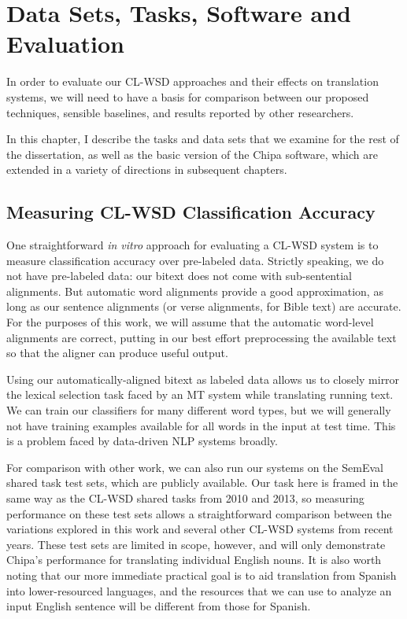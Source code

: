 \chapter{Data Sets, Tasks, Software and Evaluation}
\label{chap:evaluation}
In order to evaluate our CL-WSD approaches and their effects on translation
systems, we will need to have a basis for comparison between our proposed
techniques, sensible baselines, and results reported by other researchers.

In this chapter, I describe the tasks and data sets that we examine for the
rest of the dissertation, as well as the basic version of the Chipa software,
which are extended in a variety of directions in subsequent chapters.

\section{Measuring CL-WSD Classification Accuracy}
One straightforward \emph{in vitro} approach for evaluating a CL-WSD system is
to measure classification accuracy over pre-labeled data. Strictly speaking, we
do not have pre-labeled data: our bitext does not come with sub-sentential
alignments. But automatic word alignments provide a good approximation, as long
as our sentence alignments (or verse alignments, for Bible text) are accurate.
For the purposes of this work, we will assume that the automatic word-level
alignments are correct, putting in our best effort preprocessing the available
text so that the aligner can produce useful output.

Using our automatically-aligned bitext as labeled data allows us to closely
mirror the lexical selection task faced by an MT system while translating
running text. We can train our classifiers for many different word types, but
we will generally not have training examples available for all words in the
input at test time. This is a problem faced by data-driven NLP systems broadly.

For comparison with other work, we can also run our systems on the SemEval
shared task test sets, which are publicly available. Our task here is framed in
the same way as the CL-WSD shared tasks from 2010 and 2013, so measuring
performance on these test sets allows a straightforward comparison
between the variations explored in this work and several other CL-WSD systems
from recent years. These test sets are limited in scope, however, and will
only demonstrate Chipa's performance for translating individual English nouns.
It is also worth noting that our more immediate practical goal is to aid
translation from Spanish into lower-resourced languages, and the resources that
we can use to analyze an input English sentence will be different from those
for Spanish.

